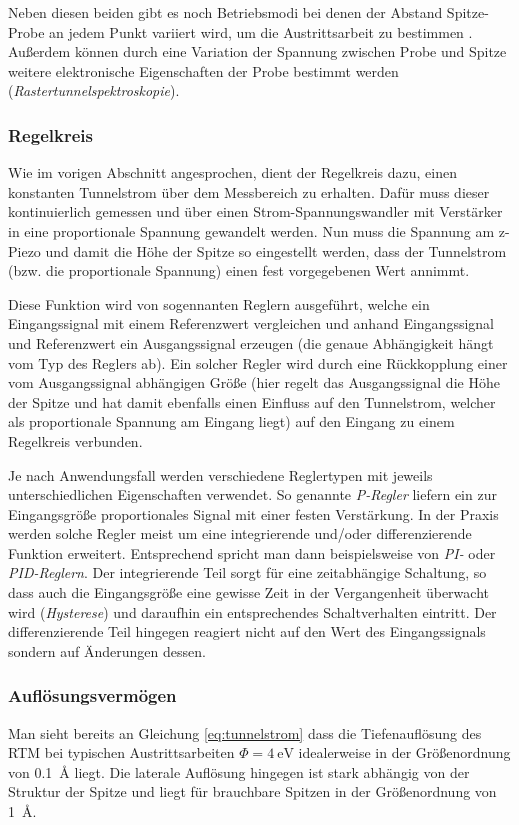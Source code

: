 \documentclass[10pt, a4paper]{article}
\begin{document}
Neben diesen beiden gibt es noch Betriebsmodi bei denen der Abstand Spitze-Probe an jedem Punkt variiert wird, um die Austrittsarbeit zu bestimmen \cite{sakai}.
Außerdem können durch eine Variation der Spannung zwischen Probe und Spitze weitere elektronische Eigenschaften der Probe bestimmt werden (\emph{Rastertunnelspektroskopie}).

\subsubsection{Regelkreis}
\label{sssec:Regelkreis}
Wie im vorigen Abschnitt angesprochen, dient der Regelkreis dazu, einen konstanten Tunnelstrom über dem Messbereich zu erhalten.
Dafür muss dieser kontinuierlich gemessen und über einen Strom-Spannungswandler mit Verstärker in eine proportionale Spannung gewandelt werden.
Nun muss die Spannung am z-Piezo und damit die Höhe der Spitze so eingestellt werden, dass der Tunnelstrom (bzw. die proportionale Spannung) einen fest vorgegebenen Wert annimmt.

Diese Funktion wird von sogennanten Reglern ausgeführt, welche ein Eingangssignal mit einem Referenzwert vergleichen und anhand Eingangssignal und Referenzwert ein Ausgangssignal erzeugen (die genaue Abhängigkeit hängt vom Typ des Reglers ab).
Ein solcher Regler wird durch eine Rückkopplung einer vom Ausgangssignal abhängigen Größe (hier regelt das Ausgangssignal die Höhe der Spitze und hat damit ebenfalls einen Einfluss auf den Tunnelstrom, welcher als proportionale Spannung am Eingang liegt) auf den Eingang zu einem Regelkreis verbunden.

Je nach Anwendungsfall werden verschiedene Reglertypen mit jeweils unterschiedlichen Eigenschaften verwendet.
So genannte \emph{P-Regler} liefern ein zur Eingangsgröße proportionales Signal mit einer festen Verstärkung.
In der Praxis werden solche Regler meist um eine integrierende und/oder differenzierende Funktion erweitert. Entsprechend spricht man dann beispielsweise von \emph{PI-} oder \emph{PID-Reglern}.
Der integrierende Teil sorgt für eine zeitabhängige Schaltung, so dass auch die Eingangsgröße eine gewisse Zeit in der Vergangenheit überwacht wird (\emph{Hysterese}) und daraufhin ein entsprechendes Schaltverhalten eintritt.
Der differenzierende Teil hingegen reagiert nicht auf den Wert des Eingangssignals sondern auf Änderungen dessen.

\subsubsection{Auflösungsvermögen}
Man sieht bereits an Gleichung \ref{eq:tunnelstrom} dass die Tiefenauflösung des RTM bei typischen Austrittsarbeiten $\Phi = \SI{4}{\electronvolt}$ idealerweise in der Größenordnung von \SI{0,1}{\angstrom} liegt.
Die laterale Auflösung hingegen ist stark abhängig von der Struktur der Spitze und liegt für brauchbare Spitzen in der Größenordnung von \SI{1}{\angstrom}.
\end{document}
